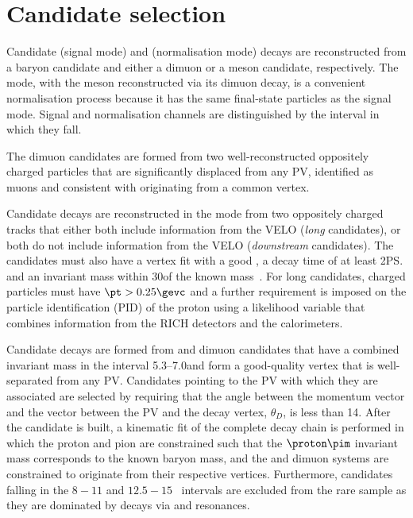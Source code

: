 \section{Candidate selection}

 Candidate \decay{\Lb}{\Lz\mumu} (signal mode) and
 \decay{\Lb}{\jpsi\Lz} (normalisation mode) decays are reconstructed
 from a \Lz baryon candidate and either a dimuon or a \jpsi meson
 candidate, respectively.  The \decay{\Lb}{\jpsi\Lz} mode, with the
 \jpsi meson reconstructed via its dimuon decay, is a convenient
 normalisation process because it has the same final-state particles
 as the signal mode. 
 Signal and normalisation channels are distinguished by the
 \qsq interval in which they fall. 

 The dimuon candidates are formed from two
 well-reconstructed oppositely charged particles that are
 significantly displaced from any PV, identified as muons and
 consistent with originating from a common vertex.
 
 Candidate \Lz decays are reconstructed in the
 \decay{\Lz}{\proton\pim} mode from two oppositely charged tracks that
 either both include information from the VELO (\textit{long}
 candidates), or both do not include information from the VELO
 (\textit{downstream} candidates). The \Lz candidates must also have a
 vertex fit with a good \chisq, a decay time of at least 2\ps and an
 invariant mass within 30\mevcc of the known \Lz
 mass~\cite{Agashe:2014kda}.  For long candidates, charged particles
 must have $\pt>0.25\gevc$ and a further requirement is imposed on the
 particle identification (PID) of the proton using a likelihood
 variable that combines information from the RICH detectors and the
 calorimeters.

 Candidate \Lb decays are formed from \Lz and dimuon candidates that
 have a combined invariant mass in the interval 5.3--7.0\gevcc and
 form a good-quality vertex that is well-separated from any PV.
 Candidates pointing to the PV with which they are associated are
 selected by requiring that the angle between the \Lb momentum vector
 and the vector between the PV and the \Lb decay vertex, $\theta_D$,
 is less than 14\mrad.  After the \Lb candidate is built, a kinematic
 fit \cite{Hulsbergen:2005pu} of the complete decay chain is performed
 in which the proton and pion are constrained such that the
 $\proton\pim$ invariant mass corresponds to the known \Lz baryon
 mass, and the \Lz and dimuon systems are constrained to originate
 from their respective vertices. Furthermore, candidates falling in the
 $8-11$ and $12.5-15$ \gevgevcccc ~\qsq intervals are excluded
 from the rare sample as they are dominated by decays via
 \jpsi and \psitwos resonances.

